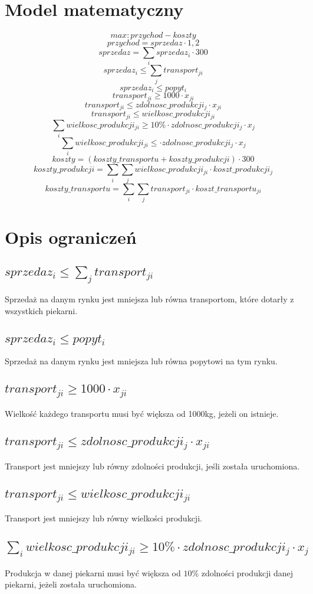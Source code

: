 \documentclass[a4paper]{article}
\begin{document}

\section{Model matematyczny}
\[max: przychod - koszty\]
\[przychod = sprzedaz \cdot 1,2\]
\[sprzedaz = \sum_{i} sprzedaz_i \cdot 300\]
\[sprzedaz_i \leq \sum_{j} transport_{ji}\]
\[sprzedaz_i \leq popyt_i\]
\[transport_{ji} \geq 1000 \cdot x_{ji}\]
\[transport_{ji} \leq zdolnosc\_produkcji_j \cdot x_{ji}\]
\[transport_{ji} \leq wielkosc\_produkcji_{ji}\]
\[\sum_{i} wielkosc\_produkcji_{ji} \geq 10\% \cdot zdolnosc\_produkcji_j \cdot x_j\]
\[\sum_{i} wielkosc\_produkcji_{ji} \leq \cdot zdolnosc\_produkcji_j \cdot x_j\]
\[koszty = (koszty\_transportu + koszty\_produkcji) \cdot 300\]
\[koszty\_produkcji = \sum_i \sum_j wielkosc\_produkcji_{ji} \cdot koszt\_produkcji_j\]
\[koszty\_transportu = \sum_i \sum_j transport_{ji} \cdot koszt\_transportu_{ji}\]
\section{Opis ograniczeń}
\subsection{\(sprzedaz_i \leq \sum_{j} transport_{ji}\)}
Sprzedaż na danym rynku jest mniejsza lub równa transportom, które dotarły z wszystkich piekarni.
\subsection{\(sprzedaz_i \leq popyt_i\)}
Sprzedaż na danym rynku jest mniejsza lub równa popytowi na tym rynku.
\subsection{\(transport_{ji} \geq 1000 \cdot x_{ji}\)}
Wielkość każdego transportu musi być większa od 1000kg, jeżeli on istnieje.
\subsection{\(transport_{ji} \leq zdolnosc\_produkcji_j \cdot x_{ji}\)}
Transport jest mniejszy lub równy zdolności produkcji, jeśli została uruchomiona.
\subsection{\(transport_{ji} \leq wielkosc\_produkcji_{ji}\)}
Transport jest mniejszy lub równy wielkości produkcji.
\subsection{\(\sum_{i} wielkosc\_produkcji_{ji} \geq 10\% \cdot zdolnosc\_produkcji_j \cdot x_j\)}
Produkcja w danej piekarni musi być większa od \(10\%\) zdolności produkcji danej piekarni, jeżeli została uruchomiona.
\end{document}
